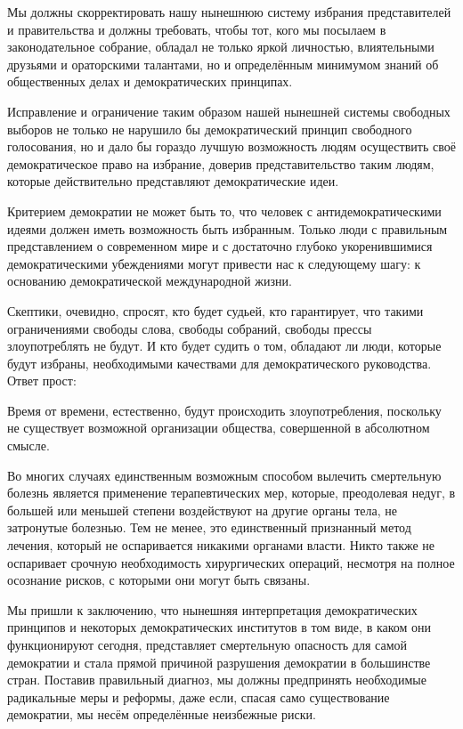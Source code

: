 Мы должны скорректировать нашу нынешнюю систему избрания представителей и правительства и должны требовать, чтобы тот, кого мы посылаем в законодательное собрание, обладал не только яркой личностью, влиятельными друзьями и ораторскими талантами, но и определённым минимумом знаний об общественных делах и демократических принципах.

Исправление и ограничение таким образом нашей нынешней системы свободных выборов не только не нарушило бы демократический принцип свободного голосования, но и дало бы гораздо лучшую возможность людям осуществить своё демократическое право на избрание, доверив представительство таким людям, которые действительно представляют демократические идеи.
 
Критерием демократии не может быть то, что человек с антидемократическими идеями должен иметь возможность быть избранным. Только люди с правильным представлением о современном мире и с достаточно глубоко укоренившимися демократическими убеждениями могут привести нас к следующему шагу: к основанию демократической международной жизни.

Скептики, очевидно, спросят, кто будет судьей, кто гарантирует, что такими ограничениями свободы слова, свободы собраний, свободы прессы злоупотреблять не будут. И кто будет судить о том, обладают ли люди, которые будут избраны, необходимыми качествами для демократического руководства. Ответ прост:
 
Время от времени, естественно, будут происходить злоупотребления, поскольку не существует возможной организации общества, совершенной в абсолютном смысле.

Во многих случаях единственным возможным способом вылечить смертельную болезнь является применение терапевтических мер, которые, преодолевая недуг, в большей или меньшей степени воздействуют на другие органы тела, не затронутые болезнью. Тем не менее, это единственный признанный метод лечения, который не оспаривается никакими органами власти. Никто также не оспаривает срочную необходимость хирургических операций, несмотря на полное осознание рисков, с которыми они могут быть связаны.
 
Мы пришли к заключению, что нынешняя интерпретация демократических принципов и некоторых демократических институтов в том виде, в каком они функционируют сегодня, представляет смертельную опасность для самой демократии и стала прямой причиной разрушения демократии в большинстве стран. Поставив правильный диагноз, мы должны предпринять необходимые радикальные меры и реформы, даже если, спасая само существование демократии, мы несём определённые неизбежные риски.

